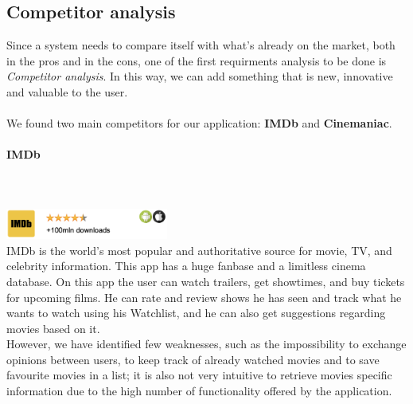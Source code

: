 \documentclass[12pt, a4paper]{article}
\numberwithin{figure}{section}
\begin{document}

\subsection{Competitor analysis}

Since a system needs to compare itself with what’s already on the market, both in the pros and in
the cons, one of the first requirments analysis to be done is \textit{Competitor analysis}.
In this way, we can add something that is new, innovative and valuable to the user.\\\\
We found two main competitors for our application: \textbf{IMDb} and \textbf{Cinemaniac}.
\paragraph{IMDb}\mbox{}\\\\
\includegraphics[width=0.4\textwidth]{Images/IMDb.png}\\
IMDb is the world's most popular and authoritative source for movie, TV, and celebrity information. This app has a
huge fanbase and a limitless cinema database.
On this app the user can watch trailers, get showtimes, and buy tickets for upcoming films. He can rate and review shows he has seen
and track what he wants to watch using his Watchlist, and he can also get suggestions regarding movies based on it.\\
However, we have identified few weaknesses, such as the impossibility to exchange opinions between users, to keep track
of already watched movies and to save favourite movies in a list; it is also not very intuitive to retrieve movies specific
information due to the high number of functionality offered by the application.
\end{document}
